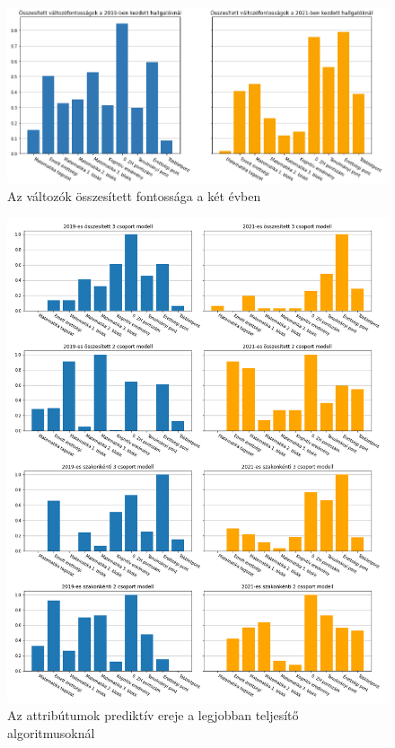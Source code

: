 \documentclass[12pt]{article}
\begin{document}
\begin{figure}[H]
\centering
\includegraphics[scale=0.6]{kepek/eves_valtozok.png}
\caption{Az változók összesített fontossága a két évben}
\label{fig:variables2}
\end{figure}

\newpage

\begin{figure}[H]
\centering
\includegraphics[scale=0.57]{kepek/modell_valtozo.png}
\caption{Az attribútumok prediktív ereje a legjobban teljesítő algoritmusoknál}
\label{fig:variables}
\end{figure}
\end{document}
